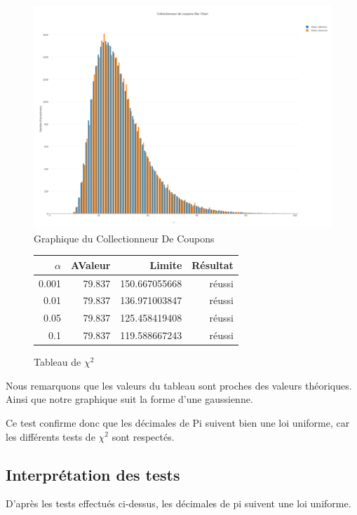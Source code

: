 \documentclass[10pt,a4paper]{article}
\begin{document}
\newpage

\begin{figure}[h]
		\centering
\includegraphics[scale=0.25]{../chart_images/collectionneur_de_coupons_bar_chart.png}
\caption{Graphique du Collectionneur De Coupons}
	\end{figure}

\begin{figure}[h]
		\centering
\begin{tabular}{|r|r|r|r|}
\hline
$\alpha$ & AValeur & Limite & Résultat\\
\hline
0.001 & 79.837 & 150.667055668 & réussi\\
0.01 & 79.837 & 136.971003847 & réussi\\
0.05 & 79.837 & 125.458419408 & réussi\\
0.1 & 79.837 & 119.588667243 & réussi\\
\hline
\end{tabular}
\caption{Tableau de $\chi^2$}
	\end{figure}
Nous remarquons que les valeurs du tableau sont proches des valeurs théoriques. Ainsi que notre graphique suit la forme d'une gaussienne. 

Ce test confirme donc que les décimales de Pi suivent bien une loi uniforme, car les différents tests de $\chi^2$ sont respectés.

\newpage
\subsection{Interprétation des tests}
D'après les tests effectués ci-dessus, les décimales de pi suivent une loi uniforme.
	
\end{document}
